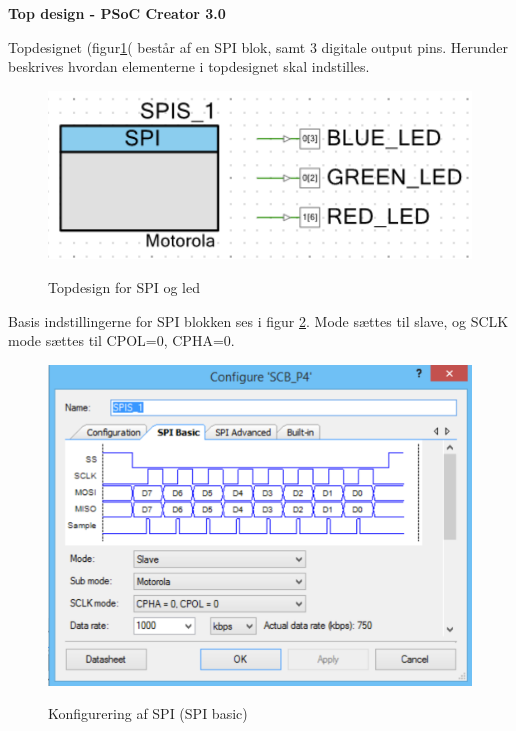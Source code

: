 
\textbf{Top design - PSoC Creator 3.0}

Topdesignet (figur\ref{lab:topdesign_spi}( består af en SPI blok, samt 3 digitale output pins. Herunder beskrives hvordan elementerne i topdesignet skal indstilles.

\begin{figure}[H] \centering
{\includegraphics[width=\textwidth]{filer/implementering/spi/spi_handler_topdesign}}
\caption{Topdesign for SPI og led}
\label{lab:topdesign_spi}
\raggedright
\end{figure}

Basis indstillingerne for SPI blokken ses i figur \ref{lab:spi_basic_config}. Mode sættes til slave, og SCLK mode sættes til CPOL=0, CPHA=0.

\begin{figure}[H] \centering
{\includegraphics[width=\textwidth]{filer/implementering/spi/spi_handler_topdesign_spi_basic}}
\caption{Konfigurering af SPI (SPI basic)}
\label{lab:spi_basic_config}
\raggedright
\end{figure}

